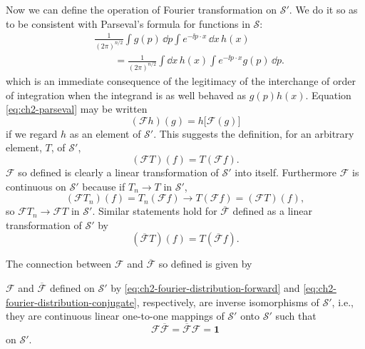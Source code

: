 Now we can define the operation of Fourier transformation on $\mathcal{S}'$.
We do it so as to be consistent with Parseval's formula for functions in
$\mathcal{S}$:
\begin{equation}
\begin{aligned}
 &\frac{1}{(2\pi)^{n/2}}\int g(p)\,\dd p
   \int e^{-\ii p\cdot x}\,\dd x\,h(x) \\
 &\qquad=\frac{1}{(2\pi)^{n/2}}\int \dd x\,h(x)
   \int e^{-\ii p\cdot x}g(p)\,\dd p .
\end{aligned}
\tag{2-44}\label{eq:ch2-parseval}
\end{equation}
which is an immediate consequence of the legitimacy of the interchange of
order of integration when the integrand is as well behaved as $g(p)h(x)$.
Equation \eqref{eq:ch2-parseval} may be written
\begin{equation}
  (\mathcal{F}h)(g)=h\bigl[\mathcal{F}(g)\bigr]
  \tag{2-45}\label{eq:ch2-fourier-distribution-pairing}
\end{equation}
if we regard $h$ as an element of $\mathcal{S}'$.  This suggests the
definition, for an arbitrary element, $T$, of $\mathcal{S}'$,
\begin{equation}
  (\mathcal{F}T)(f)=T(\mathcal{F}f) .
  \tag{2-46}\label{eq:ch2-fourier-distribution-forward}
\end{equation}
$\mathcal{F}$ so defined is clearly a linear transformation of $\mathcal{S}'$
into itself.  Furthermore $\mathcal{F}$ is continuous on $\mathcal{S}'$
because if $T_n\to T$ in $\mathcal{S}'$,
\begin{equation*}
  (\mathcal{F}T_n)(f)=T_n(\mathcal{F}f)\longrightarrow
  T(\mathcal{F}f)=(\mathcal{F}T)(f),
\end{equation*}
so $\mathcal{F}T_n\to\mathcal{F}T$ in $\mathcal{S}'$.
Similar statements hold for $\overline{\mathcal{F}}$ defined as a linear
transformation of $\mathcal{S}'$ by
\begin{equation}
  (\overline{\mathcal{F}}T)(f)=T(\overline{\mathcal{F}}f) .
  \tag{2-47}\label{eq:ch2-fourier-distribution-conjugate}
\end{equation}

The connection between $\mathcal{F}$ and $\overline{\mathcal{F}}$ so defined
is given by

\begin{theorem}\label{thm:ch2-fourier-distribution-inverse}
$\mathcal{F}$ and $\overline{\mathcal{F}}$ defined on $\mathcal{S}'$ by
\eqref{eq:ch2-fourier-distribution-forward} and \eqref{eq:ch2-fourier-distribution-conjugate}, respectively, are inverse isomorphisms of $\mathcal{S}'$,
i.e., they are continuous linear one-to-one mappings of $\mathcal{S}'$ onto
$\mathcal{S}'$ such that
\begin{equation}
  \mathcal{F}\overline{\mathcal{F}}
  =\overline{\mathcal{F}}\mathcal{F}=\mathbf{1}
  \tag{2-48}\label{eq:ch2-fourier-distribution-inverse}
\end{equation}
on $\mathcal{S}'$.
\end{theorem}

